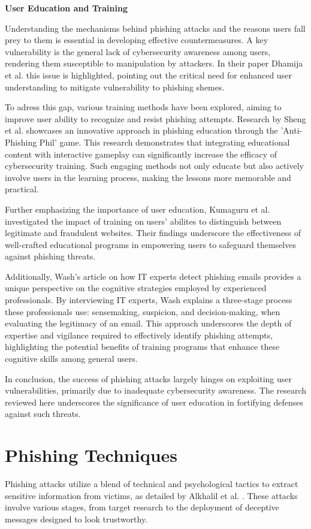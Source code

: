 \documentclass[
  a4paper,  %
  twoside,  %
  bibliography=totoc,
  headsepline,
  cleardoublepage=empty,
  parskip=half,
  draft=false
]{scrbook}
\begin{document}
\textbf{User Education and Training}

Understanding the mechanisms behind phishing attacks and the reasons users fall prey to them is essential in developing effective countermeasures. A key vulnerability is the general lack of cybersecurity awareness among users, rendering them susceptible to manipulation by attackers. In their paper Dhamija et al. \cite{dhamija} this issue is highlighted, pointing out the critical need for enhanced user understanding to mitigate vulnerability to phishing shemes. 

To adress this gap, various training methods have been explored, aiming to improve user ability to recognize and resist phishing attempts. Research by Sheng et al. \cite{sheng} showcases an innovative approach in phishing education through the 'Anti-Phishing Phil' game. This research demonstrates that integrating educational content with interactive gameplay can significantly increase the efficacy of cybersecurity training. Such engaging methods not only educate but also actively involve users in the learning process, making the lessons more memorable and practical. 

Further emphasizing the importance of user education, Kumaguru et al. \cite{kumaraguru} investigated the impact of training on users' abilites to distinguish between legitimate and fraudulent websites. Their findings underscore the effectiveness of well-crafted educational programs in empowering users to safeguard themselves against phishing threats. 

Additionally, Wash's article \cite{wash} on how IT experts detect phishing emails provides a unique perspective on the cognitive strategies employed by experienced professionals. By interviewing IT experts, Wash explains a three-stage process these professionals use: sensemaking, suspicion, and decision-making, when evaluating the legitimacy of an email. This approach underscores the depth of expertise and vigilance required to effectively identify phishing attempts, highlighting the potential benefits of training programs that enhance these cognitive skills among general users.

In conclusion, the success of phishing attacks largely hinges on exploiting user vulnerabilities, primarily due to inadequate cybersecurity awareness. The research reviewed here underscores the significance of user education in fortifying defenses against such threats.

\section{Phishing Techniques}
Phishing attacks utilize a blend of technical and psychological tactics to extract sensitive information from victims, as detailed by Alkhalil et al. \cite{alkhalil}. These attacks involve various stages, from target research to the deployment of deceptive messages designed to look trustworthy.
\end{document}
